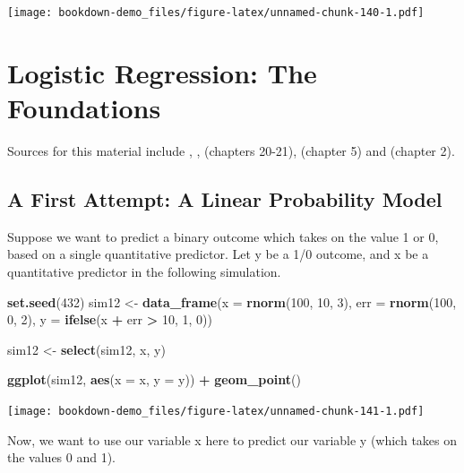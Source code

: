 \documentclass[]{book}
\newenvironment{Shaded}{\begin{snugshade}}{\end{snugshade}}
\newcommand{\KeywordTok}[1]{\textcolor[rgb]{0.13,0.29,0.53}{\textbf{#1}}}
\newcommand{\DataTypeTok}[1]{\textcolor[rgb]{0.13,0.29,0.53}{#1}}
\newcommand{\DecValTok}[1]{\textcolor[rgb]{0.00,0.00,0.81}{#1}}
\newcommand{\StringTok}[1]{\textcolor[rgb]{0.31,0.60,0.02}{#1}}
\newcommand{\OperatorTok}[1]{\textcolor[rgb]{0.81,0.36,0.00}{\textbf{#1}}}
\newcommand{\NormalTok}[1]{#1}
\theoremstyle{definition}
\theoremstyle{definition}
\theoremstyle{definition}
\theoremstyle{remark}
\begin{document}
\texttt{[image: bookdown-demo\_files/figure-latex/unnamed-chunk-140-1.pdf]}

\chapter{Logistic Regression: The
Foundations}\label{logistic-regression-the-foundations}

Sources for this material include \citet{Harrell2001},
\citet{HarrellRMSnotes}, \citet{RamseySchafer2002} (chapters 20-21),
\citet{Vittinghoff2012} (chapter 5) and \citet{Faraway2006} (chapter 2).

\section{A First Attempt: A Linear Probability
Model}\label{a-first-attempt-a-linear-probability-model}

Suppose we want to predict a binary outcome which takes on the value 1
or 0, based on a single quantitative predictor. Let y be a 1/0 outcome,
and x be a quantitative predictor in the following simulation.

\begin{Shaded}
\begin{Highlighting}[]
\KeywordTok{set.seed}\NormalTok{(}\DecValTok{432}\NormalTok{)}
\NormalTok{sim12 <-}\StringTok{ }\KeywordTok{data_frame}\NormalTok{(}\DataTypeTok{x =} \KeywordTok{rnorm}\NormalTok{(}\DecValTok{100}\NormalTok{, }\DecValTok{10}\NormalTok{, }\DecValTok{3}\NormalTok{),}
                   \DataTypeTok{err =} \KeywordTok{rnorm}\NormalTok{(}\DecValTok{100}\NormalTok{, }\DecValTok{0}\NormalTok{, }\DecValTok{2}\NormalTok{),}
                   \DataTypeTok{y =} \KeywordTok{ifelse}\NormalTok{(x }\OperatorTok{+}\StringTok{ }\NormalTok{err }\OperatorTok{>}\StringTok{ }\DecValTok{10}\NormalTok{, }\DecValTok{1}\NormalTok{, }\DecValTok{0}\NormalTok{))}

\NormalTok{sim12 <-}\StringTok{ }\KeywordTok{select}\NormalTok{(sim12, x, y)}

\KeywordTok{ggplot}\NormalTok{(sim12, }\KeywordTok{aes}\NormalTok{(}\DataTypeTok{x =}\NormalTok{ x, }\DataTypeTok{y =}\NormalTok{ y)) }\OperatorTok{+}\StringTok{ }\KeywordTok{geom_point}\NormalTok{()}
\end{Highlighting}
\end{Shaded}

\texttt{[image: bookdown-demo\_files/figure-latex/unnamed-chunk-141-1.pdf]}

Now, we want to use our variable x here to predict our variable y (which
takes on the values 0 and 1).
\end{document}
